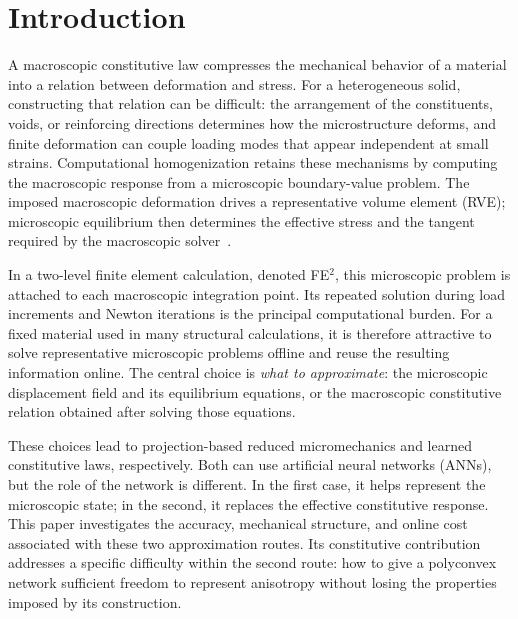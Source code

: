 \section{Introduction}
\label{sec:intro}
A macroscopic constitutive law compresses the mechanical behavior of a material into a relation between deformation and stress. For a heterogeneous solid, constructing that relation can be difficult: the arrangement of the constituents, voids, or reinforcing directions determines how the microstructure deforms, and finite deformation can couple loading modes that appear independent at small strains. Computational homogenization retains these mechanisms by computing the macroscopic response from a microscopic boundary-value problem. The imposed macroscopic deformation drives a representative volume element (RVE); microscopic equilibrium then determines the effective stress and the tangent required by the macroscopic solver~\cite{Miehe1999}.

In a two-level finite element calculation, denoted FE$^2$, this microscopic problem is attached to each macroscopic integration point. Its repeated solution during load increments and Newton iterations is the principal computational burden. For a fixed material used in many structural calculations, it is therefore attractive to solve representative microscopic problems offline and reuse the resulting information online. The central choice is \emph{what to approximate}: the microscopic displacement field and its equilibrium equations, or the macroscopic constitutive relation obtained after solving those equations.

These choices lead to projection-based reduced micromechanics and learned constitutive laws, respectively. Both can use artificial neural networks (ANNs), but the role of the network is different. In the first case, it helps represent the microscopic state; in the second, it replaces the effective constitutive response. This paper investigates the accuracy, mechanical structure, and online cost associated with these two approximation routes. Its constitutive contribution addresses a specific difficulty within the second route: how to give a polyconvex network sufficient freedom to represent anisotropy without losing the properties imposed by its construction.

